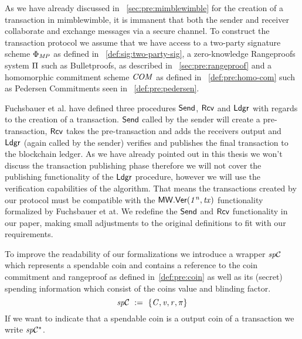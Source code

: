 As we have already discussed in ~\cref{sec:pre:mimblewimble} for the creation of a transaction in mimblewimble, it is immanent that both the sender and receiver collaborate and exchange messages via a secure channel.
To construct the transaction protocol we assume that we have access to a two-party signature scheme $\Phi_{\mathit{MP}}$ as defined in ~\cref{def:sig:two-party-sig}, a zero-knowledge Rangeproofs system $\Pi$
such as Bulletproofs, as described in ~\cref{sec:pre:rangeproof} and a homomorphic commitment scheme $\mathit{COM}$ as defined in ~\cref{def:pre:homo-com} such as Pedersen Commitments seen in ~\cref{def:pre:pedersen}.

Fuchsbauer et al. have defined three procedures $\mathsf{Send}$, $\mathsf{Rcv}$ and $\mathsf{Ldgr}$ with regards to the creation of a transaction.
$\mathsf{Send}$ called by the sender will create a pre-transaction, $\mathsf{Rcv}$ takes the pre-transaction and adds the receivers output and $\mathsf{Ldgr}$ (again called by the sender) verifies and publishes the final transaction to the blockchain ledger.
As we have already pointed out in this thesis we won't discuss the transaction publishing phase therefore we will not cover the publishing functionality of the $\mathsf{Ldgr}$ procedure, however we will use the verification capabilities of the algorithm.
That means the transactions created by our protocol must be compatible with the $\mathsf{MW.Ver(\mathit{1^n}, \mathit{tx})}$ functionality formalized by Fuchsbauer et at. 
We redefine the $\mathsf{Send}$ and $\mathsf{Rcv}$ functionality in our paper, making small adjustments to the original definitions to fit with our requirements.

To improve the readability of our formalizations we introduce a wrapper $\mathit{sp}\mathcal{C}$ which represents a spendable coin and contains a reference to the coin commitment and rangeproof as defined in~\cref{def:pre:coin} as well as its (secret) spending information which consist of the coins value and blinding factor.
\[ \mathit{sp}\mathcal{C} ~:=~ \{ \mathit{C}, \mathit{v}, \mathit{r}, \pi \} \]
If we want to indicate that a spendable coin is a output coin of a transaction we write $\mathit{sp}\mathcal{C}^*$.


